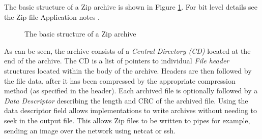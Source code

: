 \documentclass[12pt, conference]{IEEEtran}
\begin{document}
The basic structure of a Zip archive is shown in Figure
\ref{zip_structure}. For bit level details see the Zip file
Application notes \cite{zipspecs}.

\begin{figure}[tb]
  \begin{center}
  \mbox{\columnwidth {}}
  \caption{The basic structure of a Zip archive}
  \label{zip_structure}
  \end{center}
\end{figure}

As can be seen, the archive consists of a {\em Central Directory (CD)}
located at the end of the archive. The CD is a list of pointers to
individual {\em File header} structures located within the body of the
archive. Headers are then followed by the file data, after it has been
compressed by the appropriate compression method (as specified in the
header). Each archived file is optionally followed by a {\em Data
Descriptor} describing the length and CRC of the archived file. Using
the data descriptor field allows implementations to write archives
without needing to seek in the output file. This allows Zip files to
be written to pipes for example, sending an image over the network
using netcat or ssh.
\end{document}
